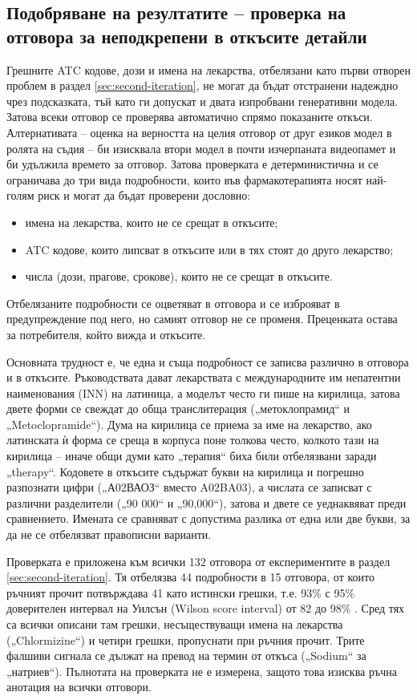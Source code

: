 \documentclass[12pt,a4paper]{article}
\makeatletter
\renewcommand\paragraph{\@startsection{paragraph}{4}{\z@}{1.5ex \@plus .5ex \@minus .2ex}{-1em}{\normalfont\normalsize\bfseries}}
\makeatother
\begin{document}
\subsection{Подобряване на резултатите -- проверка на отговора за неподкрепени в откъсите детайли}
\label{sec:third-iteration}
Грешните ATC кодове, дози и имена на лекарства, отбелязани като първи отворен проблем в раздел \ref{sec:second-iteration}, не могат да бъдат отстранени надеждно чрез подсказката, тъй като ги допускат и двата изпробвани генеративни модела. Затова всеки отговор се проверява автоматично спрямо показаните откъси. Алтернативата -- оценка на верността на целия отговор от друг езиков модел в ролята на съдия \cite{malin2024faithfulnessmetrics} -- би изисквала втори модел в почти изчерпаната видеопамет и би удължила времето за отговор. Затова проверката е детерминистична и се ограничава до три вида подробности, които във фармакотерапията носят най-голям риск и могат да бъдат проверени дословно:
\begin{itemize}[noitemsep]
\item имена на лекарства, които не се срещат в откъсите;
\item ATC кодове, които липсват в откъсите или в тях стоят до друго лекарство;
\item числа (дози, прагове, срокове), които не се срещат в откъсите.
\end{itemize}
Отбелязаните подробности се оцветяват в отговора и се изброяват в предупреждение под него, но самият отговор не се променя. Преценката остава за потребителя, който вижда и откъсите.

Основната трудност е, че една и съща подробност се записва различно в отговора и в откъсите. Ръководствата дават лекарствата с международните им непатентни наименования (INN) на латиница, а моделът често ги пише на кирилица, затова двете форми се свеждат до обща транслитерация („метоклопрамид“ и „Metoclopramide“). Дума на кирилица се приема за име на лекарство, ако латинската ѝ форма се среща в корпуса поне толкова често, колкото тази на кирилица -- иначе общи думи като „терапия“ биха били отбелязвани заради „therapy“. Кодовете в откъсите съдържат букви на кирилица и погрешно разпознати цифри („А02ВАОЗ“ вместо A02BA03), а числата се записват с различни разделители („90 000“ и „90,000“), затова и двете се уеднаквяват преди сравнението. Имената се сравняват с допустима разлика от една или две букви, за да не се отбелязват правописни варианти.

\paragraph{Оценка.} Проверката е приложена към всички 132 отговора от експериментите в раздел \ref{sec:second-iteration}. Тя отбелязва 44 подробности в 15 отговора, от които ръчният прочит потвърждава 41 като истински грешки, т.е. 93\% с 95\% доверителен интервал на Уилсън (Wilson score interval) от 82 до 98\% \cite{wilson1927}. Сред тях са всички описани там грешки, несъществуващи имена на лекарства („Chlormizine“) и четири грешки, пропуснати при ръчния прочит. Трите фалшиви сигнала се дължат на превод на термин от откъса („Sodium“ за „натриев“). Пълнотата на проверката не е измерена, защото това изисква ръчна анотация на всички отговори.
\end{document}
